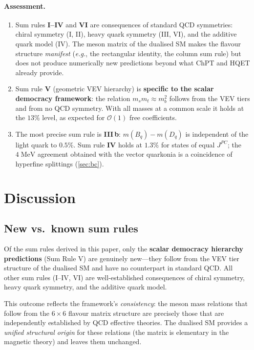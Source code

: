 \documentclass[11pt,a4paper]{article}
\newcommand{\eg}{\textit{e.g.}}
\newcommand{\Ord}{\mathcal{O}}
\theoremstyle{plain}
\begin{document}
\paragraph{Assessment.}
\begin{enumerate}[nosep]
  \item Sum rules \textbf{I--IV} and \textbf{VI} are consequences of
    standard QCD symmetries: chiral symmetry (I, II), heavy quark
    symmetry (III, VI), and the additive quark model (IV).  The meson
    matrix of the dualised SM makes the flavour structure
    \emph{manifest} (\eg, the rectangular identity, the column sum
    rule) but does not produce numerically new predictions beyond what
    ChPT and HQET already provide.
  \item Sum rule \textbf{V} (geometric VEV hierarchy) is
    \textbf{specific to the scalar democracy framework}: the relation
    $m_s m_t \approx m_b^2$ follows from the VEV tiers and from no QCD
    symmetry.  With all masses at a common scale it holds at the $13\%$
    level, as expected for $\Ord(1)$ free coefficients.
  \item The most precise sum rule is \textbf{III\,b}: $m(B_q) - m(D_q)$
    is independent of the light quark to $0.5\%$.  Sum rule
    \textbf{IV} holds at $1.3\%$ for states of equal $J^{PC}$; the
    $4\;\text{MeV}$ agreement obtained with the vector quarkonia is a
    coincidence of hyperfine splittings (\cref{sec:bc}).
\end{enumerate}


\section{Discussion}
\label{sec:discussion}

\subsection{New vs.\ known sum rules}

Of the sum rules derived in this paper, only the \textbf{scalar
democracy hierarchy predictions} (Sum Rule V) are genuinely new---they
follow from the VEV tier structure of the dualised SM and have no
counterpart in standard QCD.  All other sum rules (I--IV, VI) are
well-established consequences of chiral symmetry, heavy quark symmetry,
and the additive quark model.

This outcome reflects the framework's \emph{consistency}: the meson
mass relations that follow from the $6 \times 6$ flavour matrix
structure are precisely those that are independently established by
QCD effective theories.  The dualised SM provides a \emph{unified
structural origin} for these relations (the matrix is elementary in the
magnetic theory) and leaves them unchanged.
\end{document}
